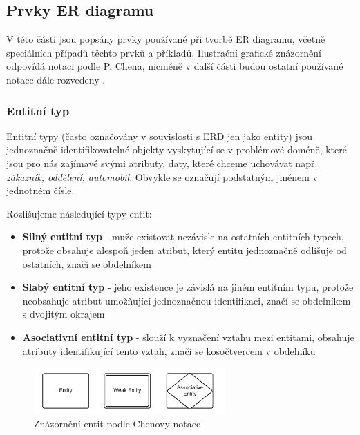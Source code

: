 \documentclass[czech,bachelor,public,dept460,male,oneside]{diploma}
\begin{document}
	\subsection{Prvky ER diagramu} \label{erDiagramFeatures}
	V této části jsou popsány prvky používané při tvorbě ER diagramu, včetně speciálních případů těchto prvků a příkladů. Ilustrační grafické znázornění odpovídá notaci podle P. Chena, nicméně v další části budou ostatní používané notace dále rozvedeny \cite{erdSymbols}.
	
	\subsubsection{Entitní typ}
	Entitní typy (často označovány v souvislosti s ERD jen jako entity) jsou jednoznačně identifikovatelné objekty vyskytující se v problémové doméně, které jsou pro nás zajímavé svými atributy, daty, které chceme uchovávat např. \textit{zákazník, oddělení, automobil}. Obvykle se označují podstatným jménem v jednotném čísle. 
	
	Rozlišujeme následující typy entit:

	\begin{itemize}
		\item \textbf{Silný entitní typ} - muže existovat nezávisle na ostatních entitních typech, protože obsahuje alespoň jeden atribut, který entitu jednoznačně odlišuje od ostatních, značí se obdelníkem
		
		\item \textbf{Slabý entitní typ} - jeho existence je závislá na jiném entitním typu, protože neobsahuje atribut umožňující jednoznačnou identifikaci, značí se obdelníkem s dvojitým okrajem
		
		\item \textbf{Asociativní entitní typ} - slouží k vyznačení vztahu mezi entitami, obsahuje atributy identifikující tento vztah, značí se kosočtvercem v obdelníku
	\end{itemize}

	\begin{figure}[!h]
		\centering
		\includegraphics[width=0.65\textwidth]{Figures/ChenEntities}
		\caption[Znázornění entit podle Chenovy notace]{Znázornění entit podle Chenovy notace \cite{erdSymbols}}
	\end{figure}
\end{document}
